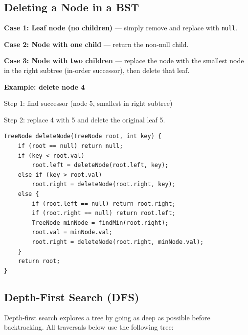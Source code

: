 \subsection{Deleting a Node in a BST}

\textbf{Case 1: Leaf node (no children)} --- simply remove and replace with \texttt{null}.

\textbf{Case 2: Node with one child} --- return the non-null child.

\textbf{Case 3: Node with two children} --- replace the node with the smallest node in the right subtree (in-order successor), then delete that leaf.

\textbf{Example: delete node 4}

Step 1: find successor (node 5, smallest in right subtree)

Step 2: replace 4 with 5 and delete the original leaf 5.

\begin{center}
\end{center}

\begin{verbatim}
TreeNode deleteNode(TreeNode root, int key) {
    if (root == null) return null;
    if (key < root.val)
        root.left = deleteNode(root.left, key);
    else if (key > root.val)
        root.right = deleteNode(root.right, key);
    else {
        if (root.left == null) return root.right;
        if (root.right == null) return root.left;
        TreeNode minNode = findMin(root.right);
        root.val = minNode.val;
        root.right = deleteNode(root.right, minNode.val);
    }
    return root;
}
\end{verbatim}

\subsection{Depth-First Search (DFS)}

Depth-first search explores a tree by going as deep as possible before backtracking.  
All traversals below use the following tree:

